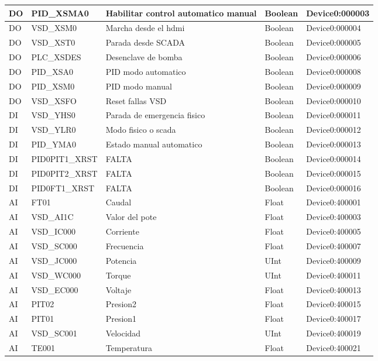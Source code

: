 \begin{longtable}{|p{1.2cm} |p{4cm} |p{4cm} |p{1.5cm} |p{3.2cm} |}
	\endlastfoot
	

	DO & PID\_XSMA0 & Habilitar control automatico manual & Boolean & Device0:000003 \\ \hline
	DO & VSD\_XSM0 & Marcha desde el hdmi & Boolean & Device0:000004 \\ \hline
	DO & VSD\_XST0 & Parada desde SCADA & Boolean & Device0:000005 \\ \hline
	DO & PLC\_XSDES & Desenclave de bomba & Boolean & Device0:000006 \\ \hline
	DO & PID\_XSA0 & PID modo automatico & Boolean & Device0:000008 \\ \hline
	DO & PID\_XSM0 & PID modo manual & Boolean & Device0:000009 \\ \hline
	DO & VSD\_XSFO & Reset fallas VSD & Boolean & Device0:000010 \\ \hline
	DI & VSD\_YHS0 & Parada de emergencia fisico & Boolean & Device0:000011 \\ \hline
	DI & VSD\_YLR0 & Modo fisico o scada & Boolean & Device0:000012 \\ \hline
	DI & PID\_YMA0 & Estado manual automatico & Boolean & Device0:000013 \\ \hline
	DI & PID0PIT1\_XRST & FALTA & Boolean & Device0:000014 \\ \hline
	DI & PID0PIT2\_XRST & FALTA & Boolean & Device0:000015 \\ \hline
	DI & PID0FT1\_XRST & FALTA & Boolean & Device0:000016 \\ \hline
	AI & FT01 & Caudal & Float & Device0:400001 \\ \hline
	AI & VSD\_AI1C & Valor del pote & Float & Device0:400003 \\ \hline
	AI & VSD\_IC000 & Corriente & Float & Device0:400005 \\ \hline
	AI & VSD\_SC000 & Frecuencia & Float & Device0:400007 \\ \hline
	AI & VSD\_JC000 & Potencia & UInt & Device0:400009 \\ \hline
	AI & VSD\_WC000 & Torque & UInt & Device0:400011 \\ \hline
	AI & VSD\_EC000 & Voltaje & Float & Device0:400013 \\ \hline
	AI & PIT02 & Presion2 & Float & Device0:400015 \\ \hline
	AI & PIT01 & Presion1 & Float & Device0:400017 \\ \hline
	AI & VSD\_SC001 & Velocidad & UInt & Device0:400019 \\ \hline
	AI & TE001 & Temperatura & Float & Device0:400021 \\ \hline

\end{longtable}
